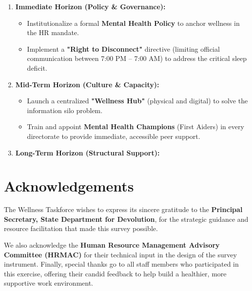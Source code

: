 \begin{enumerate}
    \item \textbf{Immediate Horizon (Policy \& Governance):}
    \begin{itemize}
        \item Institutionalize a formal \textbf{Mental Health Policy} to anchor wellness in the HR mandate.
        \item Implement a \textbf{"Right to Disconnect"} directive (limiting official communication between 7:00 PM -- 7:00 AM) to address the critical sleep deficit.
    \end{itemize}
    
    \item \textbf{Mid-Term Horizon (Culture \& Capacity):}
    \begin{itemize}
        \item Launch a centralized \textbf{"Wellness Hub"} (physical and digital) to solve the information silo problem.
        \item Train and appoint \textbf{Mental Health Champions} (First Aiders) in every directorate to provide immediate, accessible peer support.
    \end{itemize}
    
    \item \textbf{Long-Term Horizon (Structural Support):}
\end{enumerate}

\vspace{2cm}

\chapter*{Acknowledgements}
The Wellness Taskforce wishes to express its sincere gratitude to the \textbf{Principal Secretary, State Department for Devolution}, for the strategic guidance and resource facilitation that made this survey possible.

We also acknowledge the \textbf{Human Resource Management Advisory Committee (HRMAC)} for their technical input in the design of the survey instrument. Finally, special thanks go to all staff members who participated in this exercise, offering their candid feedback to help build a healthier, more supportive work environment.
